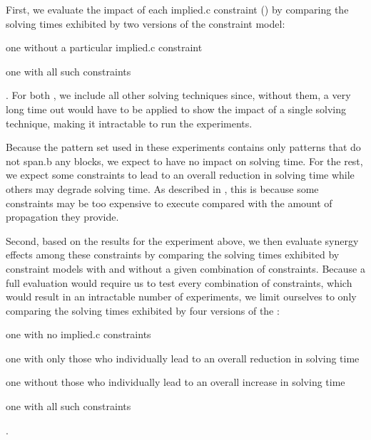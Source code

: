 
First, we evaluate the impact of each \gls{implied.c} \gls{constraint}
()
by comparing the solving times exhibited by two versions of the \gls{constraint
  model}:
%
\begin{modelList}
  \item {}
    one without a particular \gls{implied.c} \gls{constraint}
  \item {}
    one with all such \glspl{constraint}
\end{modelList}.
%
For both , we include all other solving techniques
since, without them, a very long time out would have to be applied to show the
impact of a single solving technique, making it intractable to run the
experiments.

Because the \gls{pattern set} used in these experiments contains only
\glspl{pattern} that do not \gls{span.b} any \glspl{block}, we expect
 to
have no impact on solving time.
%
For the rest, we expect some \glspl{constraint} to lead to an overall reduction
in solving time while others may degrade solving time.
%
As described in , this is because some
\glspl{constraint} may be too expensive to execute compared with the amount of
\gls{propagation} they provide.

Second, based on the results for the experiment above, we then evaluate synergy
effects among these \glspl{constraint} by comparing the solving times exhibited
by \glspl{constraint model} with and without a given combination of
\glspl{constraint}.
%
Because a full evaluation would require us to test every combination of
\glspl{constraint}, which would result in an intractable number of experiments,
we limit ourselves to only comparing the solving times exhibited by four
versions of the :
%
\begin{modelList}[resume]
  \item {}
    one with no \gls{implied.c} \glspl{constraint}
  \item {}
    one with only those who individually lead to an overall reduction in solving
    time
  \item {}
    one without those who individually lead to an overall increase in solving
    time
  \item {}
    one with all such \glspl{constraint}
\end{modelList}.

